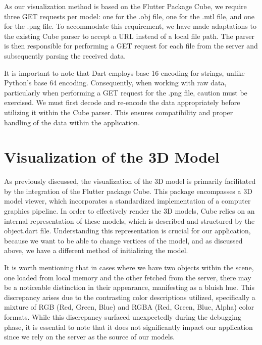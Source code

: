 As our visualization method is based on the Flutter Package Cube, we require three GET requests per model: one for the .obj file, one for 
the .mtl file, and one for the .png file. To accommodate this requirement, we have made adaptations to the existing Cube parser to accept 
a URL instead of a local file path. The parser is then responsible for performing a GET request for each file from the server and subsequently parsing the received data.

It is important to note that Dart employs base 16 encoding for strings, unlike Python's base 64 encoding. Consequently, when working with raw data, 
particularly when performing a GET request for the .png file, caution must be exercised. We must first decode and re-encode the data appropriately 
before utilizing it within the Cube parser. This ensures compatibility and proper handling of the data within the application.

\section{Visualization of the 3D Model}

As previously discussed, the visualization of the 3D model is primarily facilitated by the integration of the Flutter package Cube. 
This package encompasses a 3D model viewer, which incorporates a standardized implementation of a computer graphics pipeline. 
In order to effectively render the 3D models, Cube relies on an internal representation of these models, which is described and structured by the object.dart file.
Understanding this representation is crucial for our application, because we want to be able to change vertices of the model, and as discussed above,
we have a different method of initializing the model.

It is worth mentioning that in cases where we have two objects within the scene, one loaded from local memory and the other fetched from the server, 
there may be a noticeable distinction in their appearance, manifesting as a bluish hue. This discrepancy arises due to the contrasting color descriptions utilized, 
specifically a mixture of RGB (Red, Green, Blue) and RGBA (Red, Green, Blue, Alpha) color formats. While this discrepancy surfaced unexpectedly during 
the debugging phase, it is essential to note that it does not significantly impact our application since we rely on the server as the source of our models.

